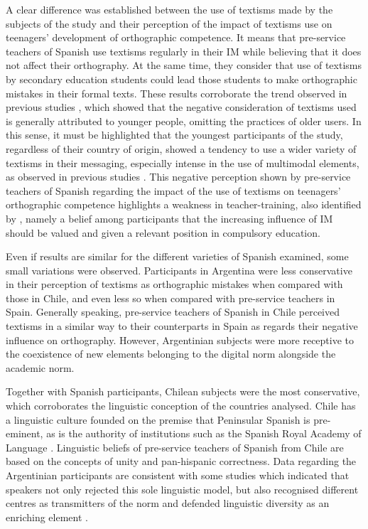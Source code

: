 \documentclass[english]{textolivre}
\begin{document}
A clear difference was established between the use of textisms made by the subjects of the study and their perception of the impact of textisms use on teenagers’ development of orthographic competence. It means that pre-service teachers of Spanish use textisms regularly in their IM while believing that it does not affect their orthography. At the same time, they consider that use of textisms by secondary education students could lead those students to make orthographic mistakes in their formal texts. These results corroborate the trend observed in previous studies \cite{Bouillaud2007, Gomez-Camacho2016, Gomez-Camacho2018, Plester2008, VAZQUEZ-CANO2015}, which showed that the negative consideration of textisms used is generally attributed to younger people, omitting the practices of older users. In this sense, it must be highlighted that the youngest participants of the study, regardless of their country of origin, showed a tendency to use a wider variety of textisms in their messaging, especially intense in the use of multimodal elements, as observed in previous studies \cite{Plester2008, Powell2011, Gomez-Camacho2018}. This negative perception shown by pre-service teachers of Spanish regarding the impact of the use of textisms on teenagers’ orthographic competence highlights a weakness in teacher-training, also identified by \textcite{Cremades2019b}, namely a belief among participants that the increasing influence of IM should be valued and given a relevant position in compulsory education. 

Even if results are similar for the different varieties of Spanish examined, some small variations were observed. Participants in Argentina were less conservative in their perception of textisms as orthographic mistakes when compared with those in Chile, and even less so when compared with pre-service teachers in Spain. Generally speaking, pre-service teachers of Spanish in Chile perceived textisms in a similar way to their counterparts in Spain as regards their negative influence on orthography. However, Argentinian subjects were more receptive to the coexistence of new elements belonging to the digital norm alongside the academic norm. 

Together with Spanish participants, Chilean subjects were the most conservative, which corroborates the linguistic conception of the countries analysed. Chile has a linguistic culture founded on the premise that Peninsular Spanish is pre-eminent, as is the authority of institutions such as the Spanish Royal Academy of Language \cite{Rojas2012}. Linguistic beliefs of pre-service teachers of Spanish from Chile are based on the concepts of unity and pan-hispanic correctness. Data regarding the Argentinian participants are consistent with some studies which indicated that speakers not only rejected this sole linguistic model, but also recognised different centres as transmitters of the norm and defended linguistic diversity as an enriching element \cite{Llull2014, Gutiérrez2018}.
\end{document}
